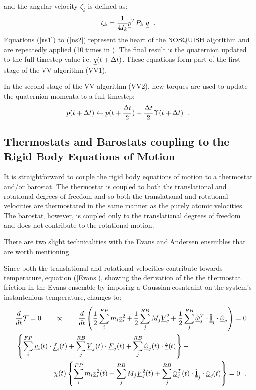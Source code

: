 and the angular velocity $\zeta_{k}$ is defined as:
\begin{equation}
\zeta_{k}={1 \over 4 I_{k}}\mbox{$\underline{p}$}^{T} P_{k}~\mbox{$\underline{q}$}~~.
\end{equation}
Equations (\ref{ns1}) to (\ref{ns2}) represent the heart of the NOSQUISH algorithm
and are repeatedly applied (10 times in \D).  The final result is the quaternion
updated to the full timestep value i.e. $\mbox{$\underline{q}$}(t+\Delta t)$.  These equations
form part of the first stage of the VV algorithm (VV1).

In the second stage of the VV algorithm (VV2), new torques are used to update the
quaternion momenta to a full timestep:
\begin{equation}
\mbox{$\underline{p}$}(t+\Delta t) \leftarrow \mbox{$\underline{p}$}(t+{\Delta t \over 2})+{\Delta t \over 2} \mbox{$\underline{\Upsilon}$}(t+\Delta t)~~.
\end{equation}

\subsection{Thermostats and Barostats coupling to the Rigid Body Equations of Motion}

It is straightforward to couple the rigid body equations of motion to a thermostat
and/or barostat.  The thermostat is coupled to both the translational and rotational
degrees of freedom and so both the translational and rotational velocities are thermostated in
the same manner as the purely atomic velocities.  The barostat, however, is coupled only to the
translational degrees of freedom and does not contribute to the rotational motion.

There are two slight technicalities with the Evans and Andersen ensembles that are worth mentioning.

Since both the translational and rotational velocities contribute towards temperature, equation (\ref{Evans}),
showing the derivation of the the thermostat friction in the Evans ensemble by imposing a Gaussian
cosntraint on the system's instantenious temperature, changes to:
\begin{eqnarray}
\frac{d}{dt} {\cal T} = 0 ~~~~~~\propto~~~~~~ \frac{d}{dt} \left( \frac{1}{2} \sum_{i}^{FP} m_{i} \mbox{$\underline{v}$}_{i}^{2} + \frac{1}{2} \sum_{j}^{RB} M_{j} \mbox{$\underline{V}$}_{j}^{2} +
\frac{1}{2} \sum_{j}^{RB} \hat{\mbox{$\underline{\omega}$}}_{j}^{T} \cdot \hat{\mbox{$\underline{\underline{\bf I}}$}}_{j} \cdot \hat{\mbox{$\underline{\omega}$}}_{j} \right) = 0 \nonumber \\
\left\{ \sum_{i}^{FP} \mbox{$\underline{v}$}_{i}(t) \cdot \mbox{$\underline{f}$}_{i}(t) + \sum_{j}^{RB} \mbox{$\underline{V}$}_{j}(t) \cdot \mbox{$\underline{F}$}_{j}(t) +
\sum_{j}^{RB} \hat{\mbox{$\underline{\omega}$}}_{j}(t) \cdot \hat{\mbox{$\underline{\tau}$}}(t) \right\} - ~~~~~~~~~~~~~~~~~~~~~~~~~\\
~~~~~~~~~~~~~~~~~~~\chi (t) \left\{ \sum_{i}^{FP} m_{i} \mbox{$\underline{v}$}_{i}^{2}(t) +
\sum_{j}^{RB} M_{j} \mbox{$\underline{V}$}_{j}^{2}(t) + \sum_{j}^{RB} \hat{\mbox{$\underline{\omega}$}}_{j}^{T}(t) \cdot \hat{\mbox{$\underline{\underline{\bf I}}$}}_{j} \cdot \hat{\mbox{$\underline{\omega}$}}_{j}(t) \right\} = 0~~. \nonumber
\end{eqnarray}

